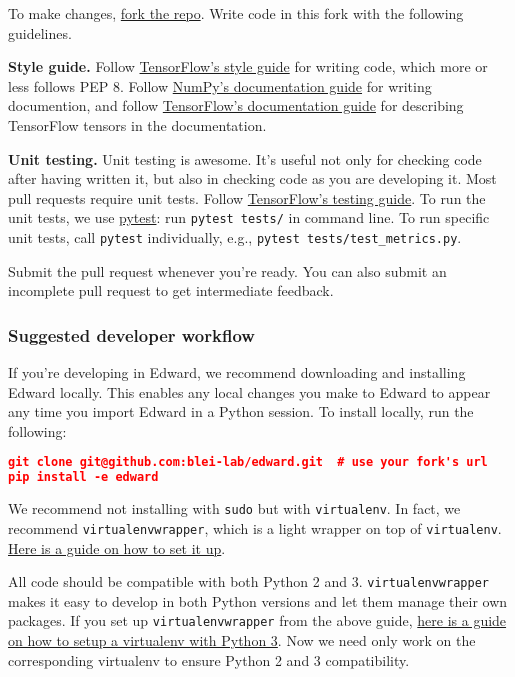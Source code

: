 To make changes,
\href{https://help.github.com/articles/working-with-forks/}{fork the repo}.
Write code in this fork with the following guidelines.

\textbf{Style guide.}
Follow
\href{https://www.tensorflow.org/versions/master/how_tos/style_guide.html}{TensorFlow's
style guide}
for writing code, which more or less follows PEP 8.
Follow
\href{https://github.com/numpy/numpy/blob/master/doc/HOWTO_DOCUMENT.rst.txt}
{NumPy's documentation guide}
for writing documention,
and follow
\href{https://www.tensorflow.org/versions/master/how_tos/documentation/index.html}{TensorFlow's documentation guide}
for describing TensorFlow tensors in the documentation.

\textbf{Unit testing.}
Unit testing is awesome. It's useful not only
for checking code after having written it, but also in checking code
as you are developing it.
Most pull requests require unit tests.
Follow
\href{https://www.tensorflow.org/versions/master/api_docs/python/test.html}
{TensorFlow's testing guide}.
To run the unit tests, we use
\href{http://doc.pytest.org/}{pytest}:
run \texttt{pytest tests/} in command line.
To run specific unit tests, call \texttt{pytest} individually, e.g.,
\texttt{pytest tests/test_metrics.py}.

Submit the pull request whenever you're ready. You can also submit an
incomplete pull request to get intermediate feedback.

\subsubsection{Suggested developer workflow}\label{suggested-workflow}

If you're developing in Edward,
we recommend downloading and installing Edward locally. This enables
any local changes you make to Edward to appear any time you
import Edward in a Python session. To install locally, run the
following:

\begin{lstlisting}[language=JSON]
git clone git@github.com:blei-lab/edward.git  # use your fork's url
pip install -e edward
\end{lstlisting}

We recommend not installing with \texttt{sudo} but with
\texttt{virtualenv}. In fact, we recommend
\texttt{virtualenvwrapper}, which is a light wrapper on top of
\texttt{virtualenv}.
\href{http://docs.python-guide.org/en/latest/starting/install/osx/}
{Here is a guide on how to set it up}.

All code should be compatible with both Python 2 and 3.
\texttt{virtualenvwrapper} makes it easy to develop in both Python versions
and let them manage their own packages.
If you set up \texttt{virtualenvwrapper} from the above guide,
\href{http://www.marinamele.com/2014/07/install-python3-on-mac-os-x-and-use-virtualenv-and-virtualenvwrapper.html}
{here is a guide on how to setup a virtualenv with Python 3}.
Now we need only work on the corresponding virtualenv to ensure Python
2 and 3 compatibility.
